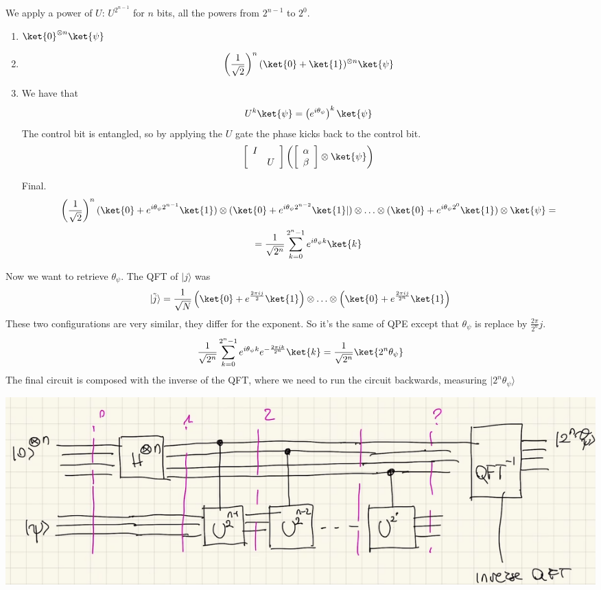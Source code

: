 \documentclass[10pt]{report}
\begin{document}
We apply a power of $U$: $U^{2^{n-1}}$ for $n$ bits, all the powers from $2^{n-1}$ to $2^0$.
\begin{enumerate}
	\item $\ket{0}^{\otimes n}\ket{\psi}$
	\item $$\left(\frac{1}{\sqrt{2}}\right)^n (\ket{0}+\ket{1})^{\otimes n}\ket{\psi}$$
	\item We have that $$U^k\ket{\psi} = \left(e^{i\theta_\psi}\right)^k\ket{\psi}$$
	The control bit is entangled, so by applying the $U$ gate the phase kicks back to the control bit.
	$$\left[\begin{array}{c c}
	I&\\
	&U
	\end{array}\right]\left(\left[\begin{array}{c}
	\alpha\\\beta
	\end{array}\right]\otimes\ket{\psi}\right)$$
	\item[Final.] $$\left(\frac{1}{\sqrt{2}}\right)^n (\ket{0}+e^{i\theta_\psi 2^{n-1}}\ket{1})\otimes(\ket{0}+e^{i\theta_\psi 2^{n-2}}\ket{1}|)\otimes\ldots\otimes(\ket{0}+e^{i\theta_\psi 2^{0}}\ket{1})\otimes\ket{\psi}=$$
$$=\frac{1}{\sqrt{2^n}}\sum_{k=0}^{2^n-1} e^{i\theta_\psi k}\ket{k}$$
\end{enumerate}
Now we want to retrieve $\theta_\psi$. The QFT of $|j\rangle$ was $$|\tilde{j}\rangle = \frac{1}{\sqrt{N}}\left(\ket{0}+e^{\frac{2\pi ij}{2}}\ket{1}\right)\otimes\ldots\otimes\left(\ket{0}+e^{\frac{2\pi ij}{2^n}}\ket{1}\right)$$
These two configurations are very similar, they differ for the exponent. So it's the same of QPE except that $\theta_\psi$ is replace by $\frac{2\pi}{2^n}j$.
$$\frac{1}{\sqrt{2^n}}\sum_{k=0}^{2^n-1} e^{i\theta_\psi k}e^{-\frac{2\pi ik}{2^n}}\ket{k} = \frac{1}{\sqrt{2^n}}\ket{2^n \theta_\psi}$$
The final circuit is composed with the inverse of the QFT, where we need to run the circuit backwards, measuring $|2^n\theta_\psi\rangle$
\begin{center}
	\includegraphics[scale=0.5]{29.png}
\end{center}
\end{document}

